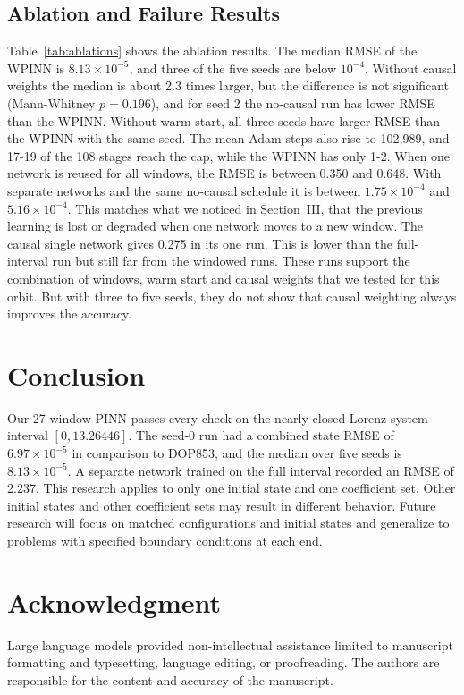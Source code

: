 \documentclass[conference,a4paper]{IEEEtran}
\begin{document}
\subsection{Ablation and Failure Results}
\label{subsec:ablation-results}
Table~\ref{tab:ablations} shows the ablation results. The median RMSE of the WPINN is $8.13\times10^{-5}$, and three of the five seeds are below $10^{-4}$. Without causal weights the median is about 2.3 times larger, but the difference is not significant (Mann-Whitney $p=0.196$), and for seed 2 the no-causal run has lower RMSE than the WPINN. Without warm start, all three seeds have larger RMSE than the WPINN with the same seed. The mean Adam steps also rise to 102,989, and 17-19 of the 108 stages reach the cap, while the WPINN has only 1-2. When one network is reused for all windows, the RMSE is between 0.350 and 0.648. With separate networks and the same no-causal schedule it is between $1.75\times10^{-4}$ and $5.16\times10^{-4}$. This matches what we noticed in Section~III, that the previous learning is lost or degraded when one network moves to a new window. The causal single network gives 0.275 in its one run. This is lower than the full-interval run but still far from the windowed runs. These runs support the combination of windows, warm start and causal weights that we tested for this orbit. But with three to five seeds, they do not show that causal weighting always improves the accuracy.

\section{Conclusion}

Our 27-window PINN passes every check on the nearly closed Lorenz-system interval $[0,13.26446]$. The seed-0 run had a combined state RMSE of $6.97\times10^{-5}$ in comparison to DOP853, and the median over five seeds is $8.13\times10^{-5}$. A separate network trained on the full interval recorded an RMSE of 2.237. This research applies to only one initial state and one coefficient set. Other initial states and other coefficient sets may result in different behavior. Future research will focus on matched configurations and initial states and generalize to problems with specified boundary conditions at each end.








\section*{Acknowledgment}
Large language models provided non-intellectual assistance limited to manuscript formatting and typesetting, language editing, or proofreading. The authors are responsible for the content and accuracy of the manuscript.



\end{document}
